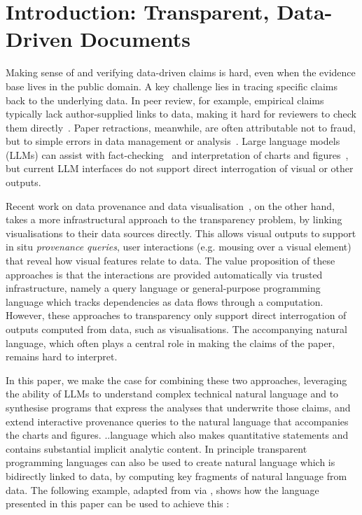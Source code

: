 \section{Introduction: Transparent, Data-Driven Documents}

Making sense of and verifying data-driven claims is hard, even when the evidence base lives in the public
domain. A key challenge lies in tracing specific claims back to the underlying data. In peer review, for
example, empirical claims typically lack author-supplied links to data, making it hard for reviewers to check
them directly~\citep{weber20}. Paper retractions, meanwhile, are often attributable not to fraud, but to
simple errors in data management or analysis~\citep{hu25}. Large language models (LLMs) can assist with
fact-checking~\citep{abu-ahmad25} and interpretation of charts and figures~\citep{roberts24}, but current LLM
interfaces do not support direct interrogation of visual or other outputs.

Recent work on data provenance and data visualisation~\citep{psallidas18smoke,perera22,bond25}, on the other
hand, takes a more infrastructural approach to the transparency problem, by linking visualisations to their
data sources directly. This allows visual outputs to support in situ \emph{provenance queries}, user
interactions (e.g. mousing over a visual element) that reveal how visual features relate to data. The value
proposition of these approaches is that the interactions are provided automatically via trusted
infrastructure, namely a query language or general-purpose programming language which tracks dependencies as
data flows through a computation. However, these approaches to transparency only support direct interrogation
of outputs computed from data, such as visualisations. The accompanying natural language, which often plays a
central role in making the claims of the paper, remains hard to interpret.

In this paper, we make the case for combining these two approaches, leveraging the ability of LLMs to
understand complex technical natural language and to synthesise programs that express the analyses that
underwrite those claims, and extend interactive provenance queries to the natural language that accompanies
the charts and figures.  ..language which also makes quantitative statements and contains substantial implicit
analytic content. In principle transparent programming languages can also be used to create natural language
which is bidirectly linked to data, by computing key fragments of natural language from data. The following
example, adapted from \cite{zhang18} via \cite{moosavi21}, shows how the language presented in this paper can
be used to achieve this :

